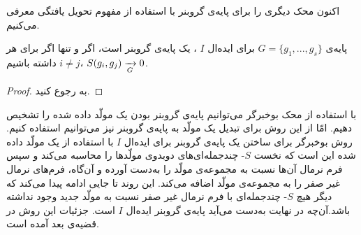 اکنون محک دیگری را برای پایه‌ی گروبنر با استفاده از مفهوم تحویل یافتگی معرفی می‌کنیم.
\begin{theorem}
	\label{buchberger criterion 2}
پایه‌ی 
$G = \{g_{1},...,g_{s}\}$
برای ایده‌ال
$I$
، یک پایه‌ی گروبنر است، اگر و تنها اگر برای هر 
$i\neq j$
داشته باشیم،
$S(g_{i},g_{j})\xrightarrow[G]{}0$.
\end{theorem}
\begin{proof}
به 
{\small \cite[ص.۱۰۶]{IVAcox}}
رجوع کنید.
\end{proof}

با استفاده از محک بوخبرگر می‌توانیم پایه‌ی گروبنر بودن یک مولّد داده شده را تشخیص دهیم. امّا از این روش برای تبدیل یک مولّد به پایه‌ی گروبنر نیز می‌توانیم استفاده کنیم. روش بوخبرگر برای ساختن یک پایه‌ی گروبنر برای ایده‌ال 
$I$
با استفاده از یک مولّد داده شده این است که نخست
$S$-
چندجمله‌ای‌های دوبدوی مولّدها را محاسبه می‌کند و سپس فرم نرمال آن‌ها نسبت به مجموعه‌ی مولّد را به‌دست  آورده  و آن‌گاه، فرم‌های نرمال غیر صفر را به مجموعه‌ی مولّد اضافه می‌کند. این روند تا جایی ادامه پیدا می‌کند که دیگر هیچ 
$S$-
چندجمله‌ای با فرم نرمال غیر صفر نسبت به مولّد جدید وجود نداشته باشد.آن‌چه در نهایت به‌دست  می‌آید پایه‌ی گروبنر ایده‌ال 
$I$
است. جزئیات این روش در قضیه‌ی بعد آمده است.

